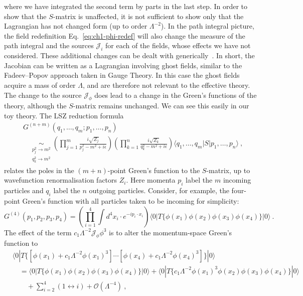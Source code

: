 where we have integrated the second term by parts in the last step. In order to
show that the $S$-matrix is unaffected, it is not sufficient to show only that
the Lagrangian has not changed form (up to order $\Lambda^{-2}$). In the path
integral picture, the field redefinition Eq.~\eqref{eq:ch1-phi-redef} will also
change the measure of the path integral and the sources $\mathcal{J}_{i}$ for
each of the fields, whose effects we have not considered. These additional
changes can be dealt with generically~\cite{Arzt:1993gz}. In short, the Jacobian
can be written as a Lagrangian involving ghost fields, similar to the
Fadeev--Popov approach taken in Gauge Theory. In this case the ghost fields
acquire a mass of order $\Lambda$, and are therefore not relevant to the
effective theory. The change to the source $\mathcal{J}_{\phi}$ does lead to a
change in the Green's functions of the theory, although the $S$-matrix remains
unchanged. We can see this easily in our toy theory. The LSZ reduction
formula~\cite{Lehmann:1954rq}
\begin{equation}
  \begin{aligned}
    &G^{(n+m)}(q_{1}, \ldots, q_{m}; p_{1}, \ldots, p_{n}) \\
    &\quad \underset{\substack{p_{j}^{2} \to m^{2}\\q_{k}^{2} \to m^{2}}}{\sim} \left(\prod_{j=1}^{m} \frac{i \sqrt{Z_{j}}}{p_{j}^{2} - m^{2} + i\epsilon}\right) \left(\prod_{k=1}^{n} \frac{i \sqrt{Z_{k}}}{q_{k}^{2} - m^{2} + i \epsilon}\right) \langle q_{1}, \ldots, q_{m} | S | p_{1}, \ldots, p_{n} \rangle \ ,
  \end{aligned}
\end{equation}
relates the poles in the $(m+n)$-point Green's function to the $S$-matrix, up to
wavefunction renormalisation factors $Z_{i}$. Here momenta $p_{i}$
label the $m$ incoming particles and $q_{i}$ label the $n$ outgoing particles.
Consider, for example, the four-point Green's function with all particles taken
to be incoming for simplicity:
\begin{equation}
  G^{(4)} (p_{1}, p_{2}, p_{3}, p_{4}) = \left( \prod_{i=1}^{4} \int d^{4}x_{i} \cdot e^{-i p_{i} \cdot x_{i}} \right) \langle 0 | T \{ \phi(x_{1}) \phi(x_{2}) \phi(x_{3}) \phi(x_{4}) \} | 0 \rangle \ .
\end{equation}
The effect of the term $c_{1} \Lambda^{-2} \mathcal{J}_{\phi} \phi^{3}$ is to
alter the momentum-space Green's function to
\begin{equation}
  \begin{aligned}
    &\langle 0 | T \{ [\phi(x_{1}) + c_{1}\Lambda^{-2}\phi(x_{1})^{3}] \cdots [\phi(x_{4}) + c_{1}\Lambda^{-2}\phi(x_{4})^{3}] \} | 0 \rangle \\
    &\quad = \langle 0 | T \{ \phi(x_{1}) \phi(x_{2}) \phi(x_{3}) \phi(x_{4}) \} | 0 \rangle + \langle 0 | T \{ c_{1} \Lambda^{-2} \phi(x_{1})^{3} \phi(x_{2}) \phi(x_{3}) \phi(x_{4}) \} | 0 \rangle \\
    &\qquad + \sum_{i=2}^{4} (1 \leftrightarrow i) + \mathcal{O}(\Lambda^{-4}) \ ,
  \end{aligned}
\end{equation}
